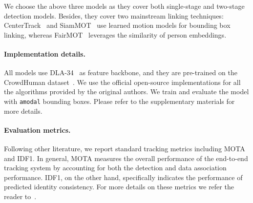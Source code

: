 \documentclass[runningheads]{llncs}
\begin{document}
We choose the above three models as they cover both single-stage and two-stage detection models. Besides, they cover two mainstream linking techniques: CenterTrack~\cite{centertrack} and SiamMOT~\cite{siammot} use learned motion models for bounding box linking,  whereas FairMOT~\cite{fairmot} leverages the similarity of person embeddings.  

\paragraph{\textbf{Implementation details.}} All models use DLA-34~\cite{dla} as feature backbone, and they are pre-trained on the CrowdHuman dataset~\cite{shao2018crowdhuman}. We use the official open-source implementations for all the algorithms provided by the original authors. 
We train and evaluate the model with \texttt{amodal} bounding boxes. Please refer to the supplementary materials for more details. 

\paragraph{\textbf{Evaluation metrics.}} Following other literature, we report standard tracking metrics including MOTA and IDF1. In general, MOTA measures the overall performance of the end-to-end tracking system by accounting for both the detection and data association performance. IDF1, on the other hand, specifically indicates the performance of predicted identity consistency. For more details on these metrics we refer the reader to~\cite{mota,idf1}. 
\end{document}
